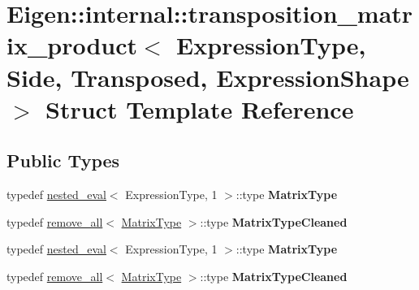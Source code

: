 \hypertarget{struct_eigen_1_1internal_1_1transposition__matrix__product}{}\section{Eigen\+:\+:internal\+:\+:transposition\+\_\+matrix\+\_\+product$<$ Expression\+Type, Side, Transposed, Expression\+Shape $>$ Struct Template Reference}
\label{struct_eigen_1_1internal_1_1transposition__matrix__product}
\subsection*{Public Types}
\begin{DoxyCompactItemize}
\item 
\mbox{\label{struct_eigen_1_1internal_1_1transposition__matrix__product_a65ac4555eea7a17d6f99ee540ad421ea}} 
typedef \hyperlink{struct_eigen_1_1internal_1_1nested__eval}{nested\+\_\+eval}$<$ Expression\+Type, 1 $>$\+::type {\bfseries Matrix\+Type}
\item 
\mbox{\label{struct_eigen_1_1internal_1_1transposition__matrix__product_afbd4b03e800ef2374758ea5770b868b9}} 
typedef \hyperlink{struct_eigen_1_1internal_1_1remove__all}{remove\+\_\+all}$<$ \hyperlink{class_eigen_1_1internal_1_1_tensor_lazy_evaluator_writable}{Matrix\+Type} $>$\+::type {\bfseries Matrix\+Type\+Cleaned}
\item 
\mbox{\label{struct_eigen_1_1internal_1_1transposition__matrix__product_a65ac4555eea7a17d6f99ee540ad421ea}} 
typedef \hyperlink{struct_eigen_1_1internal_1_1nested__eval}{nested\+\_\+eval}$<$ Expression\+Type, 1 $>$\+::type {\bfseries Matrix\+Type}
\item 
\mbox{\label{struct_eigen_1_1internal_1_1transposition__matrix__product_afbd4b03e800ef2374758ea5770b868b9}} 
typedef \hyperlink{struct_eigen_1_1internal_1_1remove__all}{remove\+\_\+all}$<$ \hyperlink{class_eigen_1_1internal_1_1_tensor_lazy_evaluator_writable}{Matrix\+Type} $>$\+::type {\bfseries Matrix\+Type\+Cleaned}
\end{DoxyCompactItemize}
